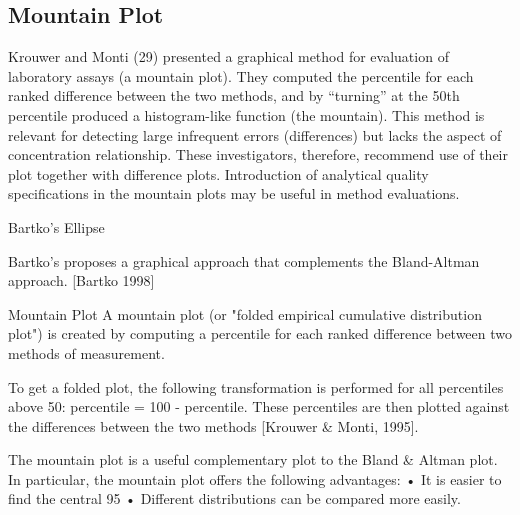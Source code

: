\subsection*{Mountain Plot}

Krouwer and Monti (29) presented a graphical method for evaluation of laboratory assays (a mountain plot). 
They computed the percentile for each ranked difference between the two methods, and by “turning” at the 50th percentile 
produced a histogram-like function (the mountain). 
This method is relevant for detecting large infrequent errors (differences) but lacks the aspect of concentration relationship. 
These investigators, therefore, recommend use of their plot together with difference plots. 
Introduction of analytical quality specifications in the mountain plots may be useful in method evaluations.

\newpage
Bartko’s Ellipse

Bartko’s proposes a graphical approach that complements the Bland-Altman approach.
[Bartko 1998]

Mountain Plot
A mountain plot (or "folded empirical cumulative distribution plot") is created by computing a percentile for each ranked difference between two methods of measurement.

To get a folded plot, the following transformation is performed for all percentiles above 50: percentile = 100 - percentile. These percentiles are then plotted against the differences between the two methods [Krouwer & Monti, 1995].

The mountain plot is a useful complementary plot to the Bland & Altman plot. 
In particular, the mountain plot offers the following advantages:
•	It is easier to find the central 95%
•	Different distributions can be compared more easily.
